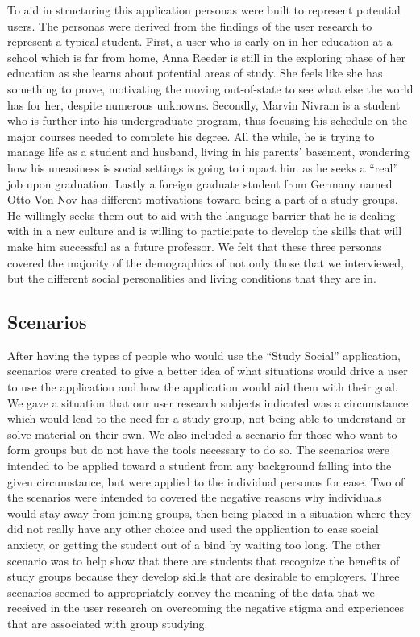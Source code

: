 \documentclass{sigchi-ext}
\begin{document}
To aid in structuring this application personas were built to represent
potential users. The personas were derived from the findings of the user
research to represent a typical student. First, a user who is early on in her
education at a school which is far from home, Anna Reeder is still in the
exploring phase of her education as she learns about potential areas of study.
She feels like she has something to prove, motivating the moving out-of-state
to see what else the world has for her, despite numerous unknowns. Secondly,
Marvin Nivram is a student who is further into his undergraduate program, thus
focusing his schedule on the major courses needed to complete his degree. All
the while, he is trying to manage life as a student and husband, living in his
parents' basement, wondering how his uneasiness is social settings is going to
impact him as he seeks a ``real'' job upon graduation. Lastly a foreign graduate
student from Germany named Otto Von Nov has different motivations toward being
a part of a study groups. He willingly seeks them out to aid with the language
barrier that he is dealing with in a new culture and is willing to participate
to develop the skills that will make him successful as a future professor. We
felt that these three personas covered the majority of the demographics of not
only those that we interviewed, but the different social personalities and
living conditions that they are in.

\subsection{Scenarios}

After having the types of people who would use the ``Study Social''
application, scenarios were created to give a better idea of what situations
would drive a user to use the application and how the application would aid
them with their goal. We gave a situation that our user research subjects
indicated was a circumstance which would lead to the need for a study group,
not being able to understand or solve material on their own. We also included a
scenario for those who want to form groups but do not have the tools necessary
to do so. The scenarios were intended to be applied toward a student from any
background falling into the given circumstance, but were applied to the
individual personas for ease. Two of the scenarios were intended to covered the
negative reasons why individuals would stay away from joining groups, then
being placed in a situation where they did not really have any other choice and
used the application to ease social anxiety, or getting the student out of a
bind by waiting too long. The other scenario was to help show that there are
students that recognize the benefits of study groups because they develop
skills that are desirable to employers. Three scenarios seemed to appropriately
convey the meaning of the data that we received in the user research on
overcoming the negative stigma and experiences that are associated with group
studying.
\end{document}
